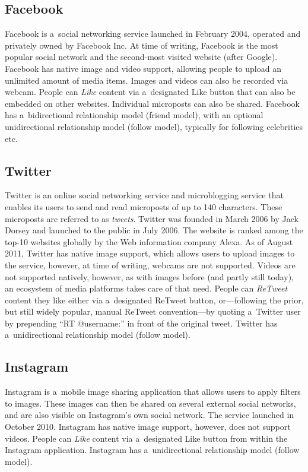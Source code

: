 \subsection{Facebook}
Facebook is a~social networking service launched in February 2004,
operated and privately owned by Facebook Inc.
At time of writing, Facebook is the most popular social network
and the second-most visited website (after Google).
Facebook has native image and video support,
allowing people to upload an unlimited amount of media items.
Images and videos can also be recorded via webcam.
People can \emph{Like} content via a~designated Like button
that can also be embedded on other websites.
Individual microposts can also be shared.
Facebook has a~bidirectional relationship model (friend model),
with an optional unidirectional relationship model (follow model),
typically for following celebrities etc.

\subsection{Twitter}
Twitter is an online social networking service and microblogging service
that enables its users to send and read microposts of up to 140 characters.
These microposts are referred to as \emph{tweets}.
Twitter was founded in March 2006 by Jack Dorsey and launched to the public in July 2006.
The website is ranked among the top-10 websites globally by the Web information company Alexa.
As of August 2011, Twitter has native image support,
which allows users to upload images to the service, however, at time of writing,
webcams are not supported.
Videos are not supported natively, however, as with images before (and partly still today),
an ecosystem of media platforms takes care of that need.
People can \emph{ReTweet} content they like either via a~designated ReTweet button,
or---following the prior, but still widely popular, manual ReTweet convention---by
quoting a~Twitter user by prepending ``RT @username:'' in front of the original tweet.
Twitter has a~unidirectional relationship model (follow model).

\subsection{Instagram}
Instagram is a~mobile image sharing application that allows users to apply filters to images.
These images can then be shared on several external social networks,
and are also visible on Instagram's own social network.
The service launched in October 2010.
Instagram has native image support, however, does not support videos.
People can \emph{Like} content via a~designated Like button
from within the Instagram application.
Instagram has a~unidirectional relationship model (follow model).

